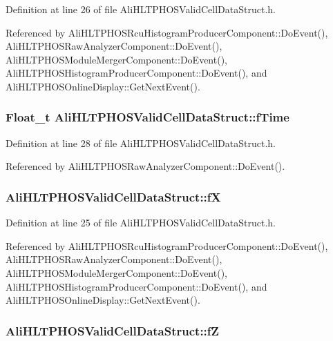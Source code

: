 Definition at line 26 of file Ali\-HLTPHOSValid\-Cell\-Data\-Struct.h.

Referenced by Ali\-HLTPHOSRcu\-Histogram\-Producer\-Component::Do\-Event(), Ali\-HLTPHOSRaw\-Analyzer\-Component::Do\-Event(), Ali\-HLTPHOSModule\-Merger\-Component::Do\-Event(), Ali\-HLTPHOSHistogram\-Producer\-Component::Do\-Event(), and Ali\-HLTPHOSOnline\-Display::Get\-Next\-Event().
\subsubsection{\setlength{\rightskip}{0pt plus 5cm}Float\_\-t {\bf Ali\-HLTPHOSValid\-Cell\-Data\-Struct::f\-Time}}\label{structAliHLTPHOSValidCellDataStruct_o4}




Definition at line 28 of file Ali\-HLTPHOSValid\-Cell\-Data\-Struct.h.

Referenced by Ali\-HLTPHOSRaw\-Analyzer\-Component::Do\-Event().
\subsubsection{ {\bf Ali\-HLTPHOSValid\-Cell\-Data\-Struct::f\-X}}\label{structAliHLTPHOSValidCellDataStruct_o1}




Definition at line 25 of file Ali\-HLTPHOSValid\-Cell\-Data\-Struct.h.

Referenced by Ali\-HLTPHOSRcu\-Histogram\-Producer\-Component::Do\-Event(), Ali\-HLTPHOSRaw\-Analyzer\-Component::Do\-Event(), Ali\-HLTPHOSModule\-Merger\-Component::Do\-Event(), Ali\-HLTPHOSHistogram\-Producer\-Component::Do\-Event(), and Ali\-HLTPHOSOnline\-Display::Get\-Next\-Event().
\subsubsection{ {\bf Ali\-HLTPHOSValid\-Cell\-Data\-Struct::f\-Z}}\label{structAliHLTPHOSValidCellDataStruct_o0}




